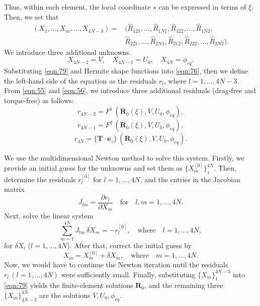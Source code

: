 \documentclass[12pt,MSc,twoside]{muthesis_2020}
\begin{document}
Thus, within each element, the local coordinate $s$ can be expressed in terms of $\xi$.
Then, we set that 
\begin{equation}
	\label{eqn:88}
    \begin{aligned}
    (X_1, ..., X_m, ...,X_{4N-3})=&(\hat{R}_{121},...,\hat{R}_{1N1},\hat{R}_{122},...,\hat{R}_{1N2},\\
    &\hat{R}_{221},...,\hat{R}_{2N1},\hat{R}_{212}, \hat{R}_{222},...,\hat{R}_{2N2}). 
     \end{aligned}
\end{equation}
We introduce three additional unknowns.
\begin{equation}
	\label{eqn:83}
    X_{4N-2}=V, \quad X_{4N-1}=U_0, \quad X_{4N}=\phi_{eq}.
\end{equation}
Substituting \eqref{eqn:79} and Hermite shape functions into \eqref{eqn:76}, then we define the left-hand side of the equation as the residuals $r_l$, where $l=1,...,4N-3$. From \eqref{eqn:55} and \eqref{eqn:56}, we introduce three additional residuals (drag-free and torque-free) as follows:
\begin{equation}
	\label{eqn:80}
    r_{4N-2}=F^1\,(\textbf{R}_0(\xi), V, U_0, \phi_{eq}),
\end{equation}
\begin{equation}
	\label{eqn:81}
    r_{4N-1}=F^2\,(\textbf{R}_0(\xi), V, U_0, \phi_{eq}),
\end{equation}
\begin{equation}
	\label{eqn:82}
    r_{4N}=\{\mathbf{T}\cdot\textbf{e}_z\}\,(\textbf{R}_0(\xi), V, U_0, \phi_{eq}).
\end{equation}

We use the multidimensional Newton method to solve this system. Firstly, we provide an initial guess for the unknowns and set them as $\{X^{[0]}_m\}^{4N}_1$. Then, determine the residuals $r^{[0]}_l$ for $l=1,...,4N$, and the entries in the Jacobian matrix
\begin{equation}
	\label{eqn:84}
    J_{lm}=\frac{\partial r_l}{\partial X_m} \quad \text{for}\quad l,m=1,...,4N.
\end{equation}
Next, solve the linear system
\begin{equation}
	\label{eqn:89}
    \sum_{m=1}^{4N} J_{lm}\,\delta X_m=-r_l^{[0]},\quad \text{where}\quad l=1,...,4N,
\end{equation}
for $\delta X_l$ ($l=1,...,4N$). After that, correct the initial guess by
\begin{equation}
	\label{eqn:90}
    X_m=X_m^{[0]}+\delta X_m,\quad \text{where}\quad m=1,...,4N.
\end{equation}
Now, we would have to continue the Newton iteration until the residuals $ r_l\,(l=1,...,4N) $ were sufficiently small.
Finally, substituting $\{X_m\}_1^{4N-3}$ into \eqref{eqn:79} yields the finite-element solutions $\mathbf{R}_0$, and the remaining three $\{X_m\}_{4N-3}^{4N}$ are the solutions $V,U_0,\phi_{eq}$.
\end{document}
